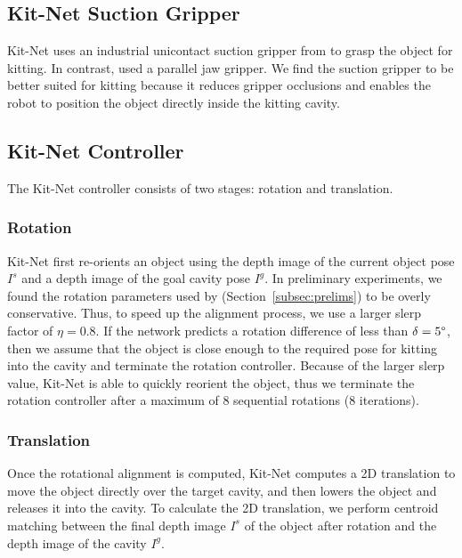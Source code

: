 \subsection{Kit-Net Suction Gripper}
Kit-Net uses an industrial unicontact suction gripper from \citet{mahler2017suction} to grasp the object for kitting. In contrast, \citeauthor{CASE_Orienting} used a parallel jaw gripper. We find the suction gripper to be better suited for kitting because it reduces gripper occlusions %
and enables the robot to position the object directly inside the kitting cavity.

\subsection{Kit-Net Controller} \label{subsec:kit-net-alg}
The Kit-Net controller consists of two stages: rotation and translation.

\subsubsection{Rotation}
Kit-Net first re-orients an object using the depth image of the current object pose $I^s$ and a depth image of the goal cavity pose $I^g$. In preliminary experiments, we found the rotation parameters used by \citet{CASE_Orienting} (Section~\ref{subsec:prelims}) to be overly conservative. Thus, to speed up the alignment process, we use a larger slerp factor of $\eta=0.8$. If the network predicts a rotation difference of less than $\delta=5\degree$, then we assume that the object is close enough to the required pose for kitting into the cavity and terminate the rotation controller. Because of the larger slerp value, Kit-Net is able to quickly reorient the object, thus we terminate the rotation controller after a maximum of 8 sequential rotations (8 iterations). 

\subsubsection{Translation}
Once the rotational alignment is computed, Kit-Net computes a 2D translation to move the object directly over the target cavity, and then lowers the object and releases it into the cavity. To calculate the 2D translation, we perform centroid matching between the final depth image $I^s$ of the object after rotation and the depth image of the cavity $I^g$.



